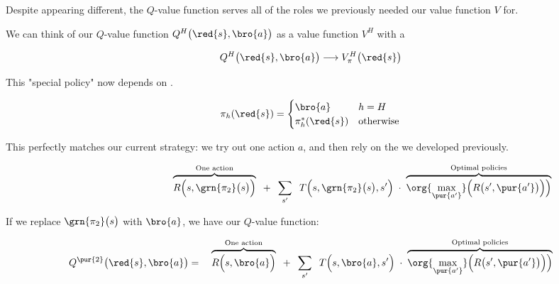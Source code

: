         Despite appearing different, the $Q$-value function serves all of the roles we previously needed our value function $V$ for.\\

        \begin{concept}
            We can think of our $Q$-value function $Q^H\big(\red{s},\bro{a}\big)$ as a value function $V^H$ with a 

            \begin{equation*}
                Q^H\big(\red{s},\bro{a}\big) \longrightarrow 
                V^H_\pi\big(\red{s}\big)
            \end{equation*}

            This "special policy" now depends on .

            \begin{equation*}
                \pi_h(\red{s}) = 
                \begin{cases}
                    \bro{a} & h=H \\
                    \pi_h^*(\red{s}) & \text{otherwise}
                \end{cases}
            \end{equation*}
        \end{concept}

        This perfectly matches our current strategy: we try out one action $a$, and then rely on the  we developed previously.

        \begin{equation}
            \phantom{V_{\grn{\pi_2}}^{\pur{2}}\big(\red{s} \big) =}\quad 
                \overbrace{
                R \Big( s,\grn{\pi_2}\big(s\big) \Big)
                }^{\text{One action}}
            \;\;+\;\;
                \sum_{s'}  
                \;\;
                    T \Big( s,\grn{\pi_2}\big(s\big),s' \Big)
                \;\cdot\; 
                \overbrace{
                \org{\max_{\pur{a'}}} \Big( R\big( s',\pur{a'}\big) \Big)  \Big)
                }^{\text{Optimal policies}}
        \end{equation}

        If we replace $\grn{\pi_2}\big(s\big)$ with $\bro{a}$, we have our $Q$-value function:

        \begin{equation}
            Q^{\pur{2}}\big(\red{s}, \bro{a} \big) =\quad 
                \overbrace{
                R \Big( s,\bro{a} \Big)
                }^{\text{One action}}
            \;\;+\;\;
                \sum_{s'}  
                \;\;
                    T \Big( s,\bro{a},s' \Big)
                \;\cdot\; 
                \overbrace{
                \org{\max_{\pur{a'}}} \Big( R\big( s',\pur{a'}\big) \Big)  \Big)
                }^{\text{Optimal policies}}
        \end{equation}


